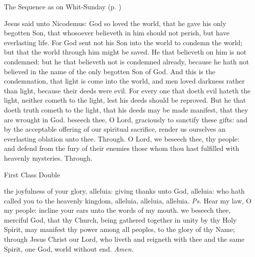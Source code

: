 \begin{rubric}
{The Sequence as on Whit-Sunday (p. \pageref{WhitSeq})}
\end{rubric}
 Jesus said unto Nicodemus: God so loved the world, that he gave his only begotten Son, that whosoever believeth in him should not perish, but have everlasting life. For God sent not his Son into the world to condemn the world; but that the world through him might be saved. He that believeth on him is not condemned: but he that believeth not is condemned already, because he hath not believed in the name of the only begotten Son of God. And this is the condemnation, that light is come into the world, and men loved darkness rather than light, because their deeds were evil. For every one that doeth evil hateth the light, neither cometh to the light, lest his deeds should be reproved. But he that doeth truth cometh to the light, that his deeds may be made manifest, that they are wrought in God.
\secret
{} beseech thee, O Lord, graciously to sanctify these gifts: and by the acceptable offering of our spiritual sacrifice, render us ourselves an everlasting oblation unto thee. Through.
\postcommunion
{} O Lord, we beseech thee, thy people: and defend from the fury of their enemies those whom thou hast fulfilled with heavenly mysteries. Through.

\begin{inhead}
    {First Class Double}
\end{inhead}
\par\noindent
{}

\introit
{} the joyfulness of your glory, alleluia: giving thanks unto God, alleluia: who hath called you to the heavenly kingdom, alleluia, alleluia, alleluia. \textit{Ps.} Hear my law, O my people: incline your ears unto the words of my mouth.
\collect
{} we beseech thee, merciful God, that thy Church, being gathered together in unity by thy Holy Spirit, may manifest thy power among all peoples, to the glory of thy Name; through Jesus Christ our Lord, who liveth and reigneth with thee and the same Spirit, one God, world without end. \textit{Amen.}

